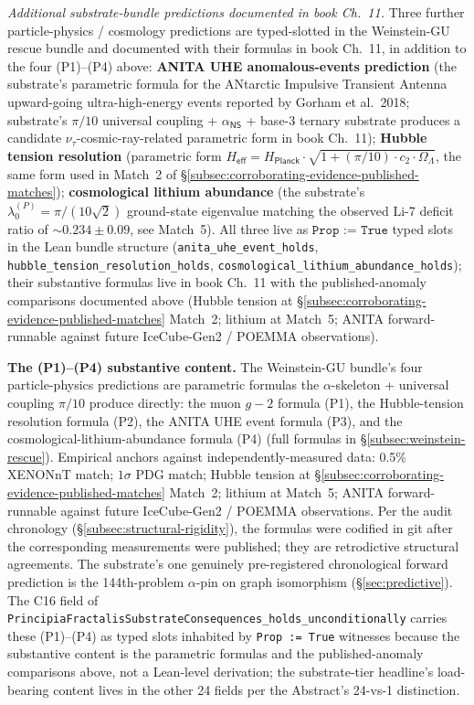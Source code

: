 \documentclass[11pt,a4paper]{amsart}
\theoremstyle{plain}
\theoremstyle{definition}
\begin{document}
\emph{Additional substrate-bundle predictions documented in book Ch.~11.} Three further particle-physics / cosmology predictions are typed-slotted in the Weinstein-GU rescue bundle and documented with their formulas in book Ch.~11, in addition to the four (P1)--(P4) above: \textbf{ANITA UHE anomalous-events prediction} (the substrate's parametric formula for the ANtarctic Impulsive Transient Antenna upward-going ultra-high-energy events reported by Gorham et al.~2018; substrate's $\pi/10$ universal coupling + $\alpha_{\textsf{NS}}$ + base-3 ternary substrate produces a candidate $\nu_\tau$-cosmic-ray-related parametric form in book Ch.~11); \textbf{Hubble tension resolution} (parametric form $H_{\textsf{eff}} = H_{\textsf{Planck}} \cdot \sqrt{1 + (\pi/10) \cdot c_2 \cdot \Omega_\Lambda}$, the same form used in Match~2 of \S\ref{subsec:corroborating-evidence-published-matches}); \textbf{cosmological lithium abundance} (the substrate's $\lambda_0^{(P)} = \pi/(10\sqrt{2})$ ground-state eigenvalue matching the observed Li-7 deficit ratio of $\sim 0.234 \pm 0.09$, see Match~5). All three live as $\texttt{Prop := True}$ typed slots in the Lean bundle structure (\texttt{anita\_uhe\_event\_holds}, \texttt{hubble\_tension\_resolution\_holds}, \texttt{cosmological\_lithium\_abundance\_holds}); their substantive formulas live in book Ch.~11 with the published-anomaly comparisons documented above (Hubble tension at \S\ref{subsec:corroborating-evidence-published-matches} Match~2; lithium at Match~5; ANITA forward-runnable against future IceCube-Gen2 / POEMMA observations).

\textbf{The (P1)--(P4) substantive content.} The Weinstein-GU bundle's four particle-physics predictions are parametric formulas the $\alpha$-skeleton + universal coupling $\pi/10$ produce directly: the muon $g\!-\!2$ formula (P1), the Hubble-tension resolution formula (P2), the ANITA UHE event formula (P3), and the cosmological-lithium-abundance formula (P4) (full formulas in \S\ref{subsec:weinstein-rescue}). Empirical anchors against independently-measured data: 0.5\% XENONnT match; $1\sigma$ PDG match; Hubble tension at \S\ref{subsec:corroborating-evidence-published-matches} Match~2; lithium at Match~5; ANITA forward-runnable against future IceCube-Gen2 / POEMMA observations. Per the audit chronology (\S\ref{subsec:structural-rigidity}), the formulas were codified in git after the corresponding measurements were published; they are retrodictive structural agreements. The substrate's one genuinely pre-registered chronological forward prediction is the 144th-problem $\alpha$-pin on graph isomorphism (\S\ref{sec:predictive}). The C16 field of \texttt{PrincipiaFractalisSubstrateConsequences\_holds\_unconditionally} carries these (P1)--(P4) as typed slots inhabited by \texttt{Prop := True} witnesses because the substantive content is the parametric formulas and the published-anomaly comparisons above, not a Lean-level derivation; the substrate-tier headline's load-bearing content lives in the other 24 fields per the Abstract's 24-vs-1 distinction.
\end{document}
